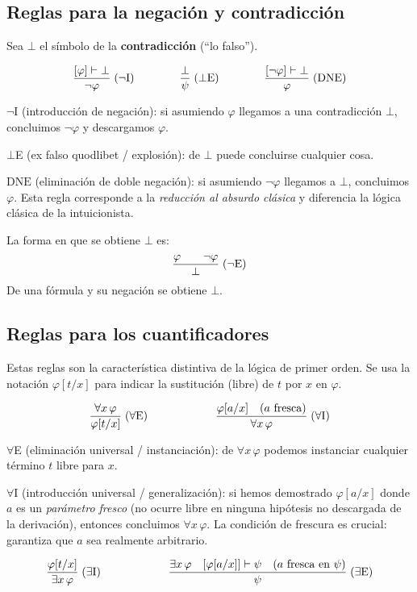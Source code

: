 \subsection{Reglas para la negación y contradicción}

Sea $\bot$ el símbolo de la \textbf{contradicción} (``lo falso'').

\[
  \infr[\neg\mathrm{I}]{[\varphi] \vdash \bot}{\neg\varphi}
  \qquad\qquad
  \infr[\bot\mathrm{E}]{\bot}{\psi}
  \qquad\qquad
  \infr[\mathrm{DNE}]{[\neg\varphi] \vdash \bot}{\varphi}
\]

$\neg$I (introducción de negación): si asumiendo $\varphi$ llegamos a una contradicción $\bot$, concluimos $\neg\varphi$ y descargamos $\varphi$.

$\bot$E (ex falso quodlibet / explosión): de $\bot$ puede concluirse cualquier cosa.

$\mathrm{DNE}$ (eliminación de doble negación): si asumiendo $\neg\varphi$ llegamos a $\bot$, concluimos $\varphi$. Esta regla corresponde a la \emph{reducción al absurdo clásica} y diferencia la lógica clásica de la intuicionista.

La forma en que se obtiene $\bot$ es:
\[
  \infr[\neg\mathrm{E}]{\varphi \qquad \neg\varphi}{\bot}
\]
De una fórmula y su negación se obtiene $\bot$.

\subsection{Reglas para los cuantificadores}

Estas reglas son la característica distintiva de la lógica de primer orden. Se usa la notación $\varphi[t/x]$ para indicar la sustitución (libre) de $t$ por $x$ en $\varphi$.

\[
  \infr[\forall\mathrm{E}]{\forall x\, \varphi}{\varphi[t/x]}
  \qquad\qquad\qquad
  \infr[\forall\mathrm{I}]{\varphi[a/x] \quad (a \text{ fresca})}{\forall x\,\varphi}
\]

$\forall$E (eliminación universal / instanciación): de $\forall x\, \varphi$ podemos instanciar cualquier término $t$ libre para $x$.

$\forall$I (introducción universal / generalización): si hemos demostrado $\varphi[a/x]$ donde $a$ es un \emph{parámetro fresco} (no ocurre libre en ninguna hipótesis no descargada de la derivación), entonces concluimos $\forall x\, \varphi$. La condición de frescura es crucial: garantiza que $a$ sea realmente arbitrario.

\[
  \infr[\exists\mathrm{I}]{\varphi[t/x]}{\exists x\, \varphi}
  \qquad\qquad\qquad
  \infr[\exists\mathrm{E}]{\exists x\,\varphi \quad [\varphi[a/x]] \vdash \psi \quad (a \text{ fresca en } \psi)}{\psi}
\]

